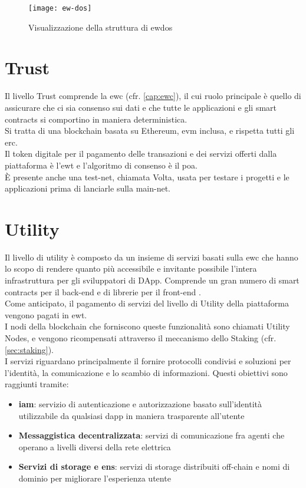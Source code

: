 \begin{figure}[h]
    \texttt{[image: ew-dos]}
    \centering
    \caption{Visualizzazione della struttura di \gls{ewdos} \cite{img:ew-dos}}
    \label{lab:ew-dos}
\end{figure}

\section{Trust}
Il livello Trust comprende la \gls{ewc} (cfr. \autoref{cap:ewc}),
il cui ruolo principale è quello di assicurare che ci sia consenso sui dati e che tutte le applicazioni e gli smart contracts si comportino in maniera deterministica. \\
Si tratta di una blockchain basata su Ethereum, \gls{evm} inclusa, e rispetta tutti gli \gls{erc}. \\
Il token digitale per il pagamento delle transazioni e dei servizi offerti dalla piattaforma è l'\gls{ewt} e l'algoritmo di consenso è il \gls{poa}. \\
È presente anche una test-net, chiamata Volta, usata per testare i progetti e le applicazioni prima di lanciarle sulla main-net.

\section{Utility}
Il livello di utility è composto da un insieme di servizi basati sulla \gls{ewc} che hanno lo scopo di rendere quanto più accessibile e invitante possibile l'intera infrastruttura per gli sviluppatori di DApp.
Comprende un gran numero di smart contracts per il back-end e di librerie per il front-end \cite{art:ew-dos}. \\
Come anticipato, il pagamento di servizi del livello di Utility della piattaforma vengono pagati in \gls{ewt}. \\
I nodi della blockchain che forniscono queste funzionalità sono chiamati Utility Nodes, e vengono ricompensati attraverso il meccanismo dello Staking (cfr. \autoref{sec:staking}).\\

I servizi riguardano principalmente il fornire protocolli condivisi e soluzioni per l'identità, la comunicazione e lo scambio di informazioni.
Questi obiettivi sono raggiunti tramite:
\begin{itemize}
    \item \textbf{\gls{iam}}: servizio di autenticazione e autorizzazione basato sull'identità utilizzabile da qualsiasi \gls{dapp} in maniera trasparente all'utente
    \item \textbf{Messaggistica decentralizzata}: servizi di comunicazione fra agenti che operano a livelli diversi della rete elettrica
    \item \textbf{Servizi di storage e \gls{ens}}: servizi di storage distribuiti off-chain e nomi di dominio per migliorare l'esperienza utente
\end{itemize}

